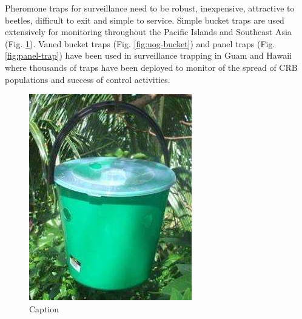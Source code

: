 \documentclass[twocolumn,letterpaper]{scrartcl}
\begin{document}
Pheromone traps for surveillance need to be robust, inexpensive, attractive to beetles, difficult to exit and simple to service. Simple bucket traps are used extensively for monitoring throughout the Pacific Islands and Southeast Asia (Fig. \ref{fig:spc-bucket}). Vaned bucket traps (Fig. \ref{fig:uog-bucket}) and panel traps (Fig. \ref{fig:panel-trap}) have been used in surveillance trapping in Guam and Hawaii where thousands of traps have been deployed to monitor of the spread of CRB populations and success of control activities.
\begin{figure}[h]
	\centering
	\includegraphics[width=0.7\linewidth]{images/spc-bucket}
	\caption{Caption}
	\label{fig:spc-bucket}
\end{figure}
\end{document}
